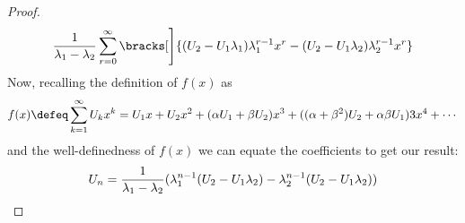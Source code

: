 \begin{proof}
\begin{align*}
          \frac 1{\lambda_1 - \lambda_2} \sum_{r = 0}^\infty \bracks[\Bigg]{
           (U_2 - U_1 \lambda_1) \lambda_1^{r - 1} x^r -
           (U_2 - U_1 \lambda_2) \lambda_2^{r - 1} x^r
          }
 \end{align*}
 Now, recalling the definition of \(f(x)\) as
 \begin{equation*}
  f(x) \defeq \sum_{k=1}^\infty U_k x^k
            = U_1 x + U_2 x^2 + (\alpha U_1 + \beta U_2) x^3
            + ((\alpha + \beta^2)U_2 + \alpha \beta U_1)3x^4 + \dotsb
 \end{equation*}
 and the well-definedness of \(f(x)\) we can equate the coefficients to get our
 result:
 \begin{equation*}
  U_n = \frac 1{\lambda_1 - \lambda_2}(\lambda_1^{n - 1}(U_2 - U_1\lambda_2)
                                     - \lambda_2^{n - 1}(U_2 - U_1\lambda_2))
                                    \qedhere
 \end{equation*}
\end{proof}

